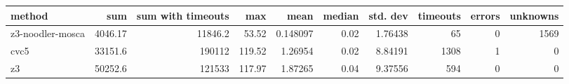 \begin{tabular}{lrrrrrrrrr}
\hline
 method           &      sum &   sum with timeouts &    max &     mean &   median &   std. dev &   timeouts &   errors &   unknowns \\
\hline
 z3-noodler-mosca &  4046.17 &             11846.2 &  53.52 & 0.148097 &     0.02 &    1.76438 &         65 &        0 &       1569 \\
 cvc5             & 33151.6  &            190112   & 119.52 & 1.26954  &     0.02 &    8.84191 &       1308 &        1 &          0 \\
 z3               & 50252.6  &            121533   & 117.97 & 1.87265  &     0.04 &    9.37556 &        594 &        0 &          0 \\
\hline
\end{tabular}
